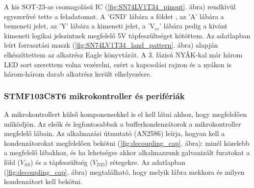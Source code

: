 \documentclass[../main.tex]{subfiles}
\begin{document}
            
            A kis SOT-23-as csomagolású IC (\ref{fig:SN74LV1T34_pinout}. ábra) rendkívül egyszerűvé tette a feladatomat. A 'GND' lábára a földet , az 'A' lábára a bemeneti jelet, az 'Y' lábára a kimeneti jelet, a 'V$_{cc}$' lábára pedig a kívánt kimeneti logikai jelszintnek megfelelő 5V tápfeszültséget %
            kötöttem. Az adatlapban\cite{ds_sn74} leírt forrasztási maszk (\ref{fig:SN74LV1T34_land_pattern}. ábra) alapján elkészíttettem az alkatrész Eagle könyvtárát. A 3. fázisú NYÁK-kal már három LED sort szerettem volna vezérelni, ezért a kapcsolási rajzon és a nyákon is három-három darab alkatrész került elhelyezésre.
            
        
        \subsubsection{STMF103C8T6 mikrokontroller és perifériák}
            A mikrokontrollert külső komponensekkel is el kell látni ahhoz, hogy megfelelően működjön. Az elsők és legfontosabbak a bufferkondenzátorok a mikrokontroller megfelelő lábain. Az alkalmazási útmutató (AN2586\cite{an2586}) leírja, hogyan kell a kondenzátorokat megfelelően bekötni (\ref{fig:decoupling_cap}. ábra): minél közelebb a megfelelő lábakhoz, és ha lehetséges akkor alkalmazzunk galvanizált furatokat a föld ($V_{SS}$) és a tápfeszültség ($V_{DD}$) rétegekre. Az adatlapban (\ref{fig:decoupling_cap}. ábra) megtalálható, hogy melyik lábra mekkora és milyen kondenzátort kell bekötni.
            
\end{document}
